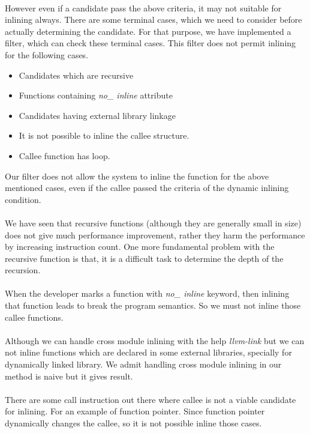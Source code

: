 \documentclass{sigplanconf}
\begin{document}
    \paragraph{}However even if a candidate pass the above criteria, it may not suitable for inlining always. There are some terminal cases, which we need to consider before actually determining the candidate. For that purpose, we have implemented a filter, which can check these terminal cases. This filter does not permit inlining for the following cases.
	\begin{itemize}
		\item Candidates which are recursive
		\item Functions containing \textit{no\_ inline} attribute
		\item Candidates having external library linkage
        \item It is not possible to inline the callee structure.
        \item Callee function has loop.
	\end{itemize}
	  Our filter does not allow the system to inline the function for the above mentioned cases, even if the callee passed the criteria of the dynamic inlining condition.
    \paragraph{} We have seen that recursive functions (although they are generally small in size) does not give much performance improvement, rather they harm the performance by increasing instruction count. One more fundamental problem with the recursive function is that, it is a difficult task to determine the depth of the recursion.
    \paragraph{} When the developer marks a function with \textit{no\_ inline} keyword, then inlining that function leads to break the program semantics. So we must not inline those callee functions.
    \paragraph{} Although we can handle cross module inlining with the help \textit{llvm-link} but we can not inline functions which are declared in some external libraries, specially for dynamically linked library. We admit handling cross module inlining in our method is naive but it gives result.
    \paragraph{} There are some call instruction out there where callee is not a viable candidate for inlining. For an example of function pointer. Since function pointer dynamically changes the callee, so it is not possible inline those cases.
\end{document}

